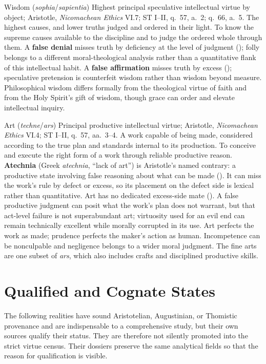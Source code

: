 \virtuedossier
  {Wisdom (\emph{sophia}/\emph{sapientia})}
  {Highest principal speculative intellectual virtue by object; Aristotle, \emph{Nicomachean Ethics} VI.7; ST I--II, q.~57, a.~2; q.~66, a.~5.}
  {The highest causes, and lower truths judged and ordered in their light.}
  {To know the supreme causes available to the discipline and to judge the ordered whole through them.}
  {A \textbf{false denial} misses truth by deficiency at the level of judgment (); folly belongs to a different moral-theological analysis rather than a quantitative flank of this intellectual habit.}
  {A \textbf{false affirmation} misses truth by excess (); speculative pretension is counterfeit wisdom rather than wisdom beyond measure.}
  {Philosophical wisdom differs formally from the theological virtue of faith and from the Holy Spirit's gift of wisdom, though grace can order and elevate intellectual inquiry.}

\virtuedossier
  {Art (\emph{techne}/\emph{ars})}
  {Principal productive intellectual virtue; Aristotle, \emph{Nicomachean Ethics} VI.4; ST I--II, q.~57, aa.~3--4.}
  {A work capable of being made, considered according to the true plan and standards internal to its production.}
  {To conceive and execute the right form of a work through reliable productive reason.}
  {\textbf{Atechnia} (Greek \emph{atechnia}, “lack of art”) is Aristotle's named contrary: a productive state involving false reasoning about what can be made (). It can miss the work's rule by defect or excess, so its placement on the defect side is lexical rather than quantitative.}
  {Art has no dedicated excess-side mate (). A false productive judgment can posit what the work's plan does not warrant, but that act-level failure is not superabundant art; virtuosity used for an evil end can remain technically excellent while morally corrupted in its use.}
  {Art perfects the work as made; prudence perfects the maker's action as human. Incompetence can be nonculpable and negligence belongs to a wider moral judgment. The fine arts are one subset of \emph{ars}, which also includes crafts and disciplined productive skills.}

\section{Qualified and Cognate States}
\label{sec:qualified}

The following realities have sound Aristotelian, Augustinian, or Thomistic provenance and are indispensable to a comprehensive study, but their own sources qualify their status. They are therefore not silently promoted into the strict virtue census. Their dossiers preserve the same analytical fields so that the reason for qualification is visible.

